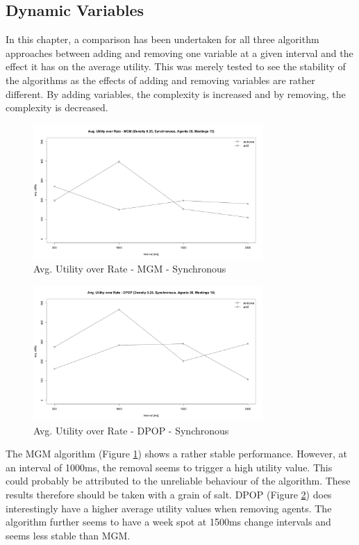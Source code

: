 \subsection{Dynamic Variables}

In this chapter, a comparison has been undertaken for all three algorithm approaches between adding and removing one variable at a given interval and the effect it has on the average utility. This was merely tested to see the stability of the algorithms as the effects of adding and removing variables are rather different. By adding variables, the complexity is increased and by removing, the complexity is decreased.

\begin{figure}[H]
\centering
  \includegraphics[width=330px]{graphics/experiments/dynamic/d_7.png}
  \caption{Avg. Utility over Rate - MGM - Synchronous}
  \label{fig:d_7}
\end{figure}
\begin{figure}[H]
\centering
  \includegraphics[width=330px]{graphics/experiments/dynamic/d_8.png}
  \caption{Avg. Utility over Rate - DPOP - Synchronous}
  \label{fig:d_8}
\end{figure}

The MGM algorithm (Figure \ref{fig:d_7}) shows a rather stable performance. However, at an interval of 1000ms, the removal seems to trigger a high utility value. This could probably be attributed to the unreliable behaviour of the algorithm. These results therefore should be taken with a grain of salt. DPOP (Figure \ref{fig:d_8}) does interestingly have a higher average utility values when removing agents. The algorithm further seems to have a week spot at 1500ms change intervals and seems less stable than MGM.



